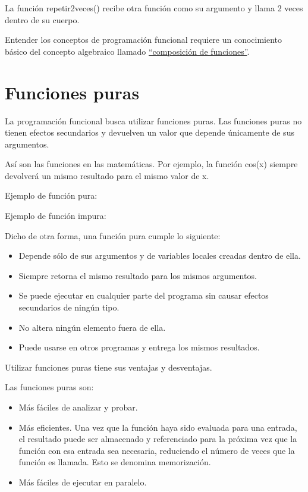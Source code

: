 \documentclass{report}
\newcommand{\doble}[1]{``#1''}
\begin{document}

La función repetir2veces() recibe otra función como su argumento y llama 2 veces dentro de su cuerpo.

Entender los conceptos de programación funcional requiere un conocimiento básico del concepto algebraico llamado \href{https://www.mathsisfun.com/sets/functions-composition.html}{\doble{composición de funciones}}.

\section{Funciones puras}

La programación funcional busca utilizar funciones puras. Las funciones puras no tienen efectos secundarios y devuelven un valor que depende únicamente de sus argumentos.

Así son las funciones en las matemáticas. Por ejemplo, la función cos(x) siempre devolverá un mismo resultado para el mismo valor de x.

Ejemplo de función pura:


Ejemplo de función impura:


Dicho de otra forma, una función pura cumple lo siguiente:

\begin{itemize}
  \item Depende sólo de sus argumentos y de variables locales creadas dentro de ella.
  
  \item Siempre retorna el mismo resultado para los mismos argumentos.

  \item Se puede ejecutar en cualquier parte del programa sin causar efectos secundarios de ningún tipo.
  
  \item No altera ningún elemento fuera de ella.
  
  \item Puede usarse en otros programas y entrega los mismos resultados.
\end{itemize}

Utilizar funciones puras tiene sus ventajas y desventajas.

Las funciones puras son:

\begin{itemize}
  \item Más fáciles de analizar y probar.
  
  \item Más eficientes. Una vez que la función haya sido evaluada para una entrada, el resultado puede ser almacenado y referenciado para la próxima vez que la función con esa entrada sea necesaria, reduciendo el número de veces que la función es llamada. Esto se denomina memorización.
  
  \item Más fáciles de ejecutar en paralelo.
\end{itemize}
\end{document}
